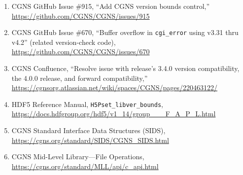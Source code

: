 \documentclass[11pt,letterpaper]{article}
\begin{document}
\begin{enumerate}[leftmargin=2em]
\item CGNS GitHub Issue \#915, ``Add CGNS version bounds control,''\\
  \url{https://github.com/CGNS/CGNS/issues/915}

\item CGNS GitHub Issue \#670, ``Buffer overflow in \texttt{cgi\_error}
  using v3.31 thru v4.2'' (related version-check code),\\
  \url{https://github.com/CGNS/CGNS/issues/670}

\item CGNS Confluence, ``Resolve issue with release's 3.4.0 version
  compatibility, the 4.0.0 release, and forward compatibility,''\\
  \url{https://cgnsorg.atlassian.net/wiki/spaces/CGNS/pages/220463122/}

\item HDF5 Reference Manual, \texttt{H5Pset\_libver\_bounds},\\
  \url{https://docs.hdfgroup.org/hdf5/v1_14/group___F_A_P_L.html}

\item CGNS Standard Interface Data Structures (SIDS),\\
  \url{https://cgns.org/standard/SIDS/CGNS_SIDS.html}

\item CGNS Mid-Level Library---File Operations,\\
  \url{https://cgns.org/standard/MLL/api/c_api.html}
\end{enumerate}
\end{document}
